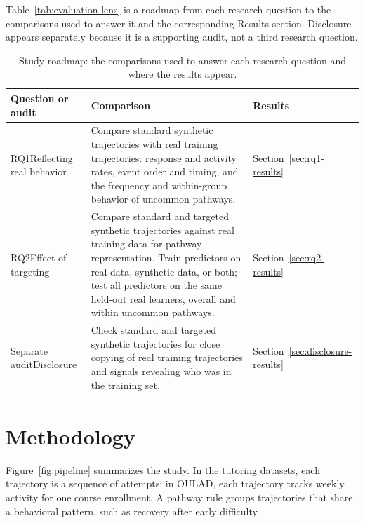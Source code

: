 \documentclass[fleqn,10pt]{JLA_article}
\begin{document}
Table~\ref{tab:evaluation-lens} is a roadmap from each research question to the comparisons used to answer it and the corresponding Results section. Disclosure appears separately because it is a supporting audit, not a third research question.

\begin{table}[!htbp]
\centering
\caption{Study roadmap: the comparisons used to answer each research question and where the results appear.}
\label{tab:evaluation-lens}
\label{tab:rq-design}
\small
\setlength{\tabcolsep}{4pt}
\renewcommand{\arraystretch}{1.15}
\begin{tabularx}{\linewidth}{|>{\raggedright\arraybackslash}p{3.4cm}|>{\raggedright\arraybackslash}X|>{\raggedright\arraybackslash}p{2.4cm}|}
\hline
Question or audit & Comparison & Results \\ \hline
RQ1\newline Reflecting real behavior & Compare standard synthetic trajectories with real training trajectories: response and activity rates, event order and timing, and the frequency and within-group behavior of uncommon pathways. & Section~\ref{sec:rq1-results} \\ \hline
RQ2\newline Effect of targeting & Compare standard and targeted synthetic trajectories against real training data for pathway representation. Train predictors on real data, synthetic data, or both; test all predictors on the same held-out real learners, overall and within uncommon pathways. & Section~\ref{sec:rq2-results} \\ \hline
Separate audit\newline Disclosure & Check standard and targeted synthetic trajectories for close copying of real training trajectories and signals revealing who was in the training set. & Section~\ref{sec:disclosure-results} \\ \hline
\end{tabularx}
\end{table}
\FloatBarrier

\section{Methodology}

Figure~\ref{fig:pipeline} summarizes the study. In the tutoring datasets, each trajectory is a sequence of attempts; in OULAD, each trajectory tracks weekly activity for one course enrollment. A pathway rule groups trajectories that share a behavioral pattern, such as recovery after early difficulty.
\end{document}
